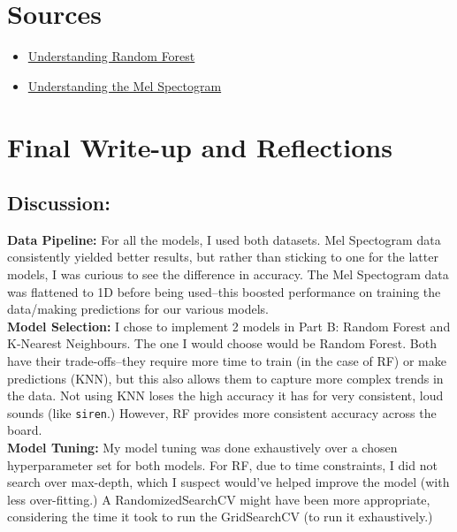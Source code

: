 \documentclass[11pt]{article}
\begin{document}
\section{Sources}

\begin{itemize}
    \item \href{https://towardsdatascience.com/understanding-random-forest-58381e0602d2}{Understanding Random Forest}
    \item \href{https://medium.com/analytics-vidhya/understanding-the-mel-spectrogram-fca2afa2ce53}{Understanding the Mel Spectogram}
\end{itemize}


\section{Final Write-up and Reflections}

\subsection{Discussion:} 

\noindent \textbf{Data Pipeline:} For all the models, I used both datasets. Mel Spectogram data consistently yielded better results, but rather than sticking to one for the latter models, I was curious to see the difference in accuracy. The Mel Spectogram data was flattened to 1D before being used--this boosted performance on training the data/making predictions for our various models.\\

\noindent \textbf{Model Selection:} I chose to implement 2 models in Part B: Random Forest and K-Nearest Neighbours. The one I would choose would be Random Forest. Both have their trade-offs--they require more time to train (in the case of RF) or make predictions (KNN), but this also allows them to capture more complex trends in the data. Not using KNN loses the high accuracy it has for very consistent, loud sounds (like \texttt{siren}.) However, RF provides more consistent accuracy across the board.\\

\noindent \textbf{Model Tuning:} My model tuning was done exhaustively over a chosen hyperparameter set for both models. For RF, due to time constraints, I did not search over max-depth, which I suspect would've helped improve the model (with less over-fitting.) A RandomizedSearchCV might have been more appropriate, considering the time it took to run the GridSearchCV (to run it exhaustively.)\\
\end{document}
